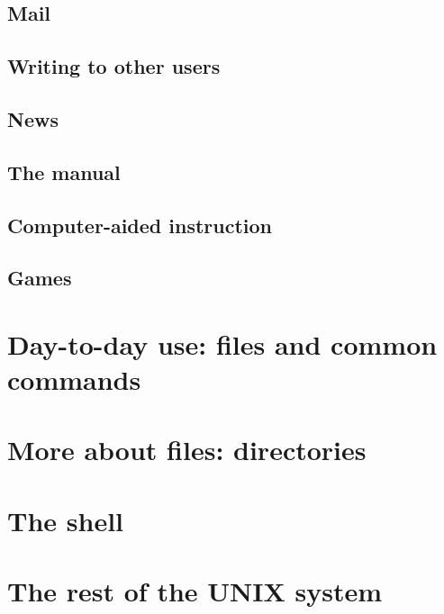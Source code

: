 \subsection{Mail}
\subsection{Writing to other users}
\subsection{News}
\subsection{The manual}
\subsection{Computer-aided instruction}
\subsection{Games}

\section{Day-to-day use: files and common commands}
\section{More about files: directories}
\section{The shell}
\section{The rest of the UNIX system}
